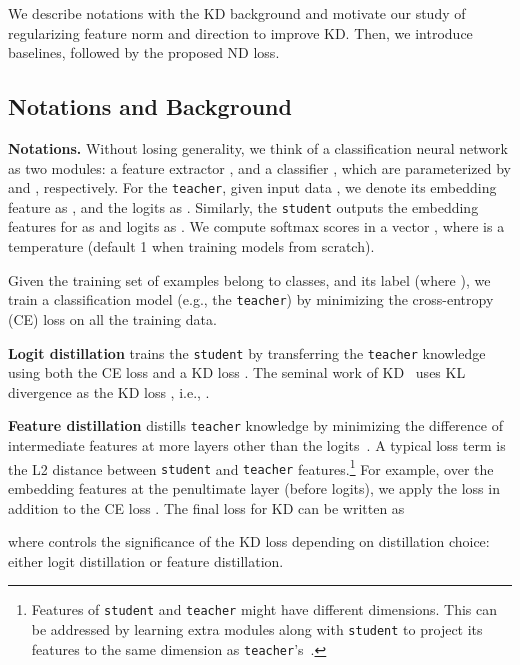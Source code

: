 \documentclass{article}
\begin{document}
We describe notations with the KD background 
and motivate our study of regularizing feature norm and direction to improve KD.
Then, we introduce baselines, followed by the proposed ND loss.

\subsection{Notations and Background}

{\bf Notations.}
Without losing generality, we think of a classification neural network as two modules: a feature extractor , and a classifier , which are parameterized by  and , respectively.
For the {\tt teacher}, given input data ,
we denote its embedding feature as ,
and the logits as .
Similarly, the {\tt student} outputs the embedding features for  as  and logits as .
We compute softmax scores in a vector , where  is a temperature (default 1 when training models from scratch).

Given the training set of  examples belong to  classes,  and its label  (where ), we train a classification model (e.g., the {\tt teacher}) by minimizing the cross-entropy (CE) loss  on all the training data.



{\bf Logit distillation}
trains the {\tt student} by transferring the {\tt teacher} knowledge using both the CE loss  and a KD loss .
The seminal work of KD~\cite{hinton2015distilling} uses KL divergence as the KD loss ,
i.e., . 





{\bf Feature distillation} distills {\tt teacher} knowledge by minimizing the difference of intermediate features at more layers other than the logits~\cite{zagoruyko2016paying, yim2017gift, chen2021distilling}.
A typical loss term is the L2 distance  between {\tt student} and {\tt teacher} features.\footnote{Features of {\tt student} and {\tt teacher} might have different dimensions.
This can be addressed by learning extra modules along with {\tt student} to project its features to the same dimension as {\tt teacher}'s~\cite{chen2021distilling}.}
For example, over the embedding features at the penultimate layer (before logits), we apply the loss  in addition to the CE loss .
The final loss for KD can be written as

where  controls the significance of the KD loss  depending on distillation choice: either logit distillation or feature distillation.
\end{document}
